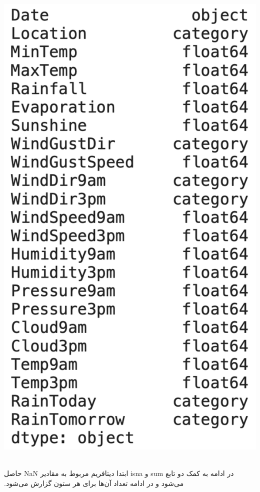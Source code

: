 ‫\begin{center}
‫\includegraphics[scale=0.35]{figs/test.png}
‫\end{center}
‫
‫در ادامه به کمک دو تابع sum و isna ابتدا دیتافریم مربوط به مقادیر NaN حاصل می‌شود و در ادامه تعداد آن‌ها برای هر ستون گزارش می‌شود. 
‫
